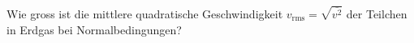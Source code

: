 Wie gross ist die mittlere quadratische Geschwindigkeit $v_\text{rms} = \sqrt{\overline{v^2}}$ der Teilchen in Erdgas bei Normalbedingungen?
